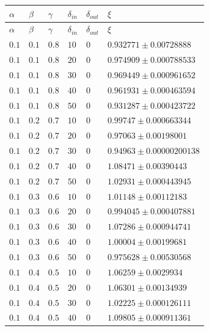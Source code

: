 \documentclass[14pt]{extreport}
\begin{document}
\begin{center}
\begin{longtable}{|p{1cm}|p{1cm}|p{1cm}|p{1cm}|p{1cm}|p{8cm}|} \hline
$\alpha$ & $\beta$ & $\gamma$ & $\delta_{in}$ & $\delta_{out}$ & $\xi$ \\ \hline
\endfirsthead
\hline
$\alpha$ & $\beta$ & $\gamma$ & $\delta_{in}$ & $\delta_{out}$ & $\xi$ \\ \hline
\endhead
\endfoot
\endlastfoot
$0.1$ & $0.1$ & $0.8$ & $10$ & $0$ & $0.932771 \pm 0.00728888$ \\ \hline
$0.1$ & $0.1$ & $0.8$ & $20$ & $0$ & $0.974909 \pm 0.000788533$ \\ \hline
$0.1$ & $0.1$ & $0.8$ & $30$ & $0$ & $0.969449 \pm 0.000961652$ \\ \hline
$0.1$ & $0.1$ & $0.8$ & $40$ & $0$ & $0.961931 \pm 0.000463594$ \\ \hline
$0.1$ & $0.1$ & $0.8$ & $50$ & $0$ & $0.931287 \pm 0.000423722$ \\ \hline
$0.1$ & $0.2$ & $0.7$ & $10$ & $0$ & $0.99747 \pm 0.000663344$ \\ \hline
$0.1$ & $0.2$ & $0.7$ & $20$ & $0$ & $0.97063 \pm 0.00198001$ \\ \hline
$0.1$ & $0.2$ & $0.7$ & $30$ & $0$ & $0.94963 \pm 0.00000200138$ \\ \hline
$0.1$ & $0.2$ & $0.7$ & $40$ & $0$ & $1.08471 \pm 0.00390443$ \\ \hline
$0.1$ & $0.2$ & $0.7$ & $50$ & $0$ & $1.02931 \pm 0.000443945$ \\ \hline
$0.1$ & $0.3$ & $0.6$ & $10$ & $0$ & $1.01148 \pm 0.00112183$ \\ \hline
$0.1$ & $0.3$ & $0.6$ & $20$ & $0$ & $0.994045 \pm 0.000407881$ \\ \hline
$0.1$ & $0.3$ & $0.6$ & $30$ & $0$ & $1.07286 \pm 0.000944741$ \\ \hline
$0.1$ & $0.3$ & $0.6$ & $40$ & $0$ & $1.00004 \pm 0.00199681$ \\ \hline
$0.1$ & $0.3$ & $0.6$ & $50$ & $0$ & $0.975628 \pm 0.00530568$ \\ \hline
$0.1$ & $0.4$ & $0.5$ & $10$ & $0$ & $1.06259 \pm 0.0029934$ \\ \hline
$0.1$ & $0.4$ & $0.5$ & $20$ & $0$ & $1.06301 \pm 0.00134939$ \\ \hline
$0.1$ & $0.4$ & $0.5$ & $30$ & $0$ & $1.02225 \pm 0.000126111$ \\ \hline
$0.1$ & $0.4$ & $0.5$ & $40$ & $0$ & $1.09805 \pm 0.000911361$ \\ \hline

\end{longtable}
\end{center}
\end{document}
